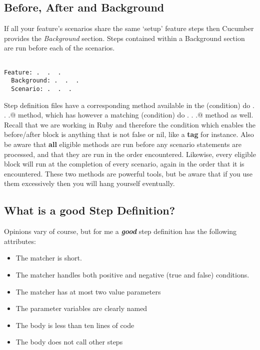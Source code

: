 \documentclass[10pt]{book}
\begin{document}
\subsection{Before, After and Background}

If all your feature's scenarios share the same `setup' feature steps then Cucumber provides the \emph{Background} section.  Steps contained within a Background section are run before each of the scenarios.

\begin{verbatim}

Feature: .  .  .
  Background: .  .  .
  Scenario: .  .  .

\end{verbatim}

Step definition files have a corresponding method available in the \verb@before(condition) do .  .  .@ method, which has however a matching \verb@after(condition) do .  .  .@ method as well.  Recall that we are working in Ruby and therefore the condition which enables the before/after block is anything that is not false or nil, like a \textbf{tag} for instance.  Also be aware that \textbf{all} eligible \verb@before@ methods are run before any scenario statements are processed, and that they are run in the order encountered.  Likewise, every eligible \verb@after@ block will run at the completion of every scenario, again in the order that it is encountered.  These two methods are powerful tools, but be aware that if you use them excessively then you will hang yourself eventually.

\subsection{What is a good Step Definition?}

Opinions vary of course, but for me a \textbf{\emph{good}} step definition has the following attributes:

\begin{itemize}
  \item The matcher is short.
  \item The matcher handles both positive and negative (true and false) conditions.
  \item The matcher has at most two value parameters
  \item The parameter variables are clearly named
  \item The body is less than ten lines of code
  \item The body does not call other steps
\end{itemize}
\end{document}
